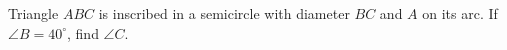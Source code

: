 Triangle $ABC$ is inscribed in a semicircle with diameter $BC$ and $A$ on its arc. If $\angle B=40^\circ$, find $\angle C$.
